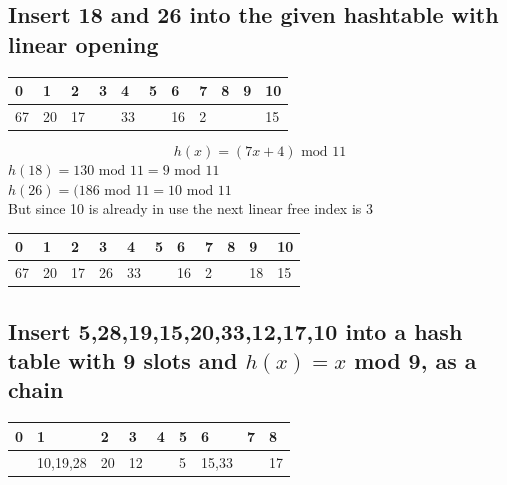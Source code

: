\documentclass[12pt, a4paper]{article}
\begin{document}
			\subsection{Insert 18 and 26 into the given hashtable with linear opening}				
					  \begin{table}[h!]
								 \center
								 \begin{tabular}{|l|l|l|l|l|l|l|l|l|l|l|}
											\hline
											0 & 1 & 2 & 3 & 4 &5 &6 &7&8&9&10\\\hline
											67&20&17&&33&&16&2&&&15\\\hline
								  \end{tabular}
					  \end{table}
					  $$h(x)=(7x+4)\text{ mod 11}$$
					  $h(18)=130\text{ mod 11} = 9 \text{ mod 11}$\\
					  $h(26)=(186\text{ mod 11} = 10 \text{ mod 11}$\\
					  But since 10 is already in use the next linear free index is 3\\
					  \begin{table}[h!]
								 \center
								 \begin{tabular}{|l|l|l|l|l|l|l|l|l|l|l|}
											\hline
											0 & 1 & 2 & 3 & 4 &5 &6 &7&8&9&10\\\hline
											67&20&17&26&33&&16&2&&18&15\\\hline
								  \end{tabular}
					  \end{table}	
			\subsection{Insert 5,28,19,15,20,33,12,17,10 into a hash table with 9 slots and $h(x)=x$ mod 9, as a chain}
				\begin{table}[h!]
					  \center
					  \begin{tabular}{|l|l|l|l|l|l|l|l|l|}
								 \hline
								 0 & 1 & 2 & 3 & 4 &5 &6 &7&8\\\hline
									&10,19,28&20&12&&5&15,33&&17\\\hline
						\end{tabular}
				\end{table}
\end{document}
